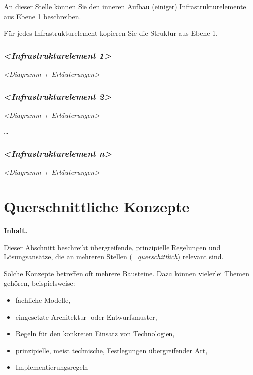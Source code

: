 \documentclass[]{article}
\begin{document}
An dieser Stelle können Sie den inneren Aufbau (einiger)
Infrastrukturelemente aus Ebene 1 beschreiben.

Für jedes Infrastrukturelement kopieren Sie die Struktur aus Ebene 1.

\subsubsection{\texorpdfstring{\emph{\textless{}Infrastrukturelement
1\textgreater{}}}{\textless{}Infrastrukturelement 1\textgreater{}}}\label{__emphasis_infrastrukturelement_1_emphasis}

\emph{\textless{}Diagramm + Erläuterungen\textgreater{}}

\subsubsection{\texorpdfstring{\emph{\textless{}Infrastrukturelement
2\textgreater{}}}{\textless{}Infrastrukturelement 2\textgreater{}}}\label{__emphasis_infrastrukturelement_2_emphasis}

\emph{\textless{}Diagramm + Erläuterungen\textgreater{}}

\ldots{}

\subsubsection{\texorpdfstring{\emph{\textless{}Infrastrukturelement
n\textgreater{}}}{\textless{}Infrastrukturelement n\textgreater{}}}\label{__emphasis_infrastrukturelement_n_emphasis}

\emph{\textless{}Diagramm + Erläuterungen\textgreater{}}

\section{Querschnittliche Konzepte}\label{section-concepts}

\textbf{Inhalt.}

Dieser Abschnitt beschreibt übergreifende, prinzipielle Regelungen und
Lösungsansätze, die an mehreren Stellen (=\emph{querschittlich})
relevant sind.

Solche Konzepte betreffen oft mehrere Bausteine. Dazu können vielerlei
Themen gehören, beispielsweise:

\begin{itemize}
\item
  fachliche Modelle,
\item
  eingesetzte Architektur- oder Entwurfsmuster,
\item
  Regeln für den konkreten Einsatz von Technologien,
\item
  prinzipielle, meist technische, Festlegungen übergreifender Art,
\item
  Implementierungsregeln
\end{itemize}
\end{document}
